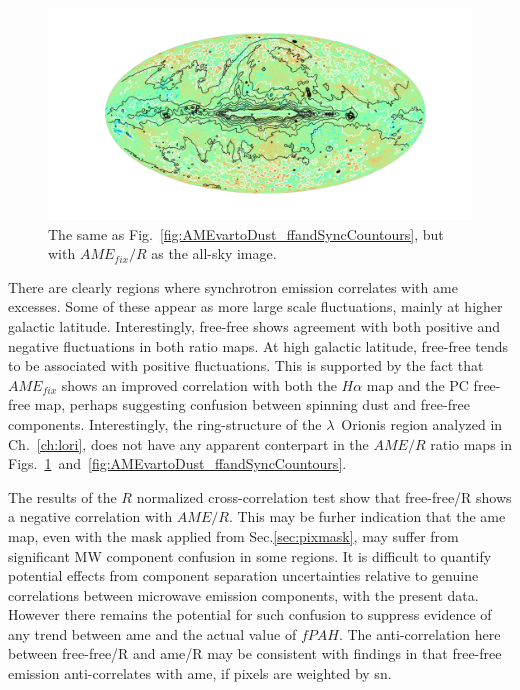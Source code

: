                 \begin{figure}
                    \includegraphics[width=\textwidth,trim={6cm 2cm 5.0cm 2cm},clip]{../Plots/ch_allsky/AMEfixtoDust_ffandSyncCountours.pdf}
                    \centering
                    \caption{The same as Fig.~\ref{fig:AMEvartoDust_ffandSyncCountours}, but with $AME_{fix}/R$ as the all-sky image.}
                    \label{fig:AMEfixtoDust_ffandSyncCountours}
                \end{figure}
             There are clearly regions where synchrotron emission correlates with \gls{ame} excesses. Some of these appear as more large scale fluctuations, mainly at higher galactic latitude. Interestingly, free-free shows agreement with both positive and negative fluctuations in both ratio maps. At high galactic latitude, free-free tends to be associated with positive fluctuations. This is supported by the fact that $AME_{fix}$ shows an improved correlation with both the $H\alpha{}$ map and the PC free-free map, perhaps suggesting confusion between spinning dust and free-free components. Interestingly, the ring-structure of the $\lambda$~Orionis region analyzed in Ch.~\ref{ch:lori}, does not have any apparent conterpart in the $AME/R$ ratio maps in Figs.~\ref{fig:AMEfixtoDust_ffandSyncCountours}~and~\ref{fig:AMEvartoDust_ffandSyncCountours}.

             The results of the $R$ normalized cross-correlation test show that free-free/R shows a negative correlation with $AME/R$. This may be furher indication that the \gls{ame} map, even with the mask applied from Sec.\ref{sec:pixmask}, may suffer from significant MW component confusion in some regions. It is difficult to quantify potential effects from component separation uncertainties relative to genuine correlations between microwave emission components, with the present data. However there remains the potential for such confusion to suppress evidence of any trend between \gls{ame} and the actual value of $fPAH$. The anti-correlation here between free-free/R and \gls{ame}/R may be consistent with findings in \cite{vonHausegger15} that free-free emission anti-correlates with \gls{ame}, if pixels are weighted by \gls{sn}.

